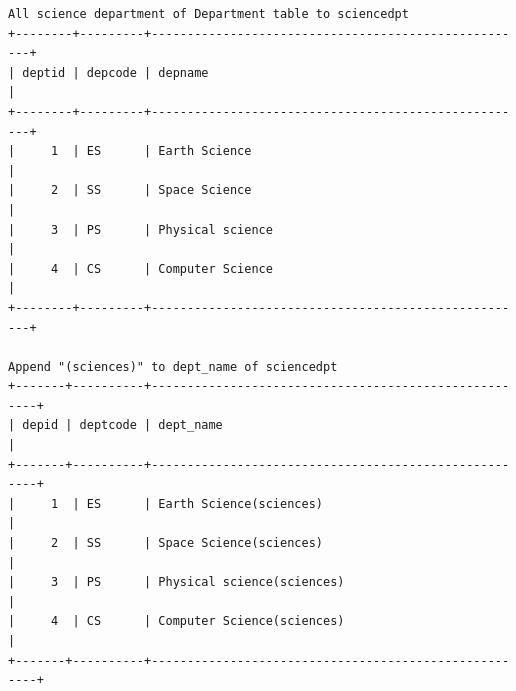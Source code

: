 \documentclass{article}
\begin{document}
\newpage
\fancyhead{} %
\newpage
{}
\begin{verbatim}
All science department of Department table to sciencedpt
+--------+---------+-----------------------------------------------------+
| deptid | depcode | depname                                             |
+--------+---------+-----------------------------------------------------+
|     1  | ES      | Earth Science                                       |
|     2  | SS      | Space Science                                       |
|     3  | PS      | Physical science                                    |
|     4  | CS      | Computer Science                                    |
+--------+---------+-----------------------------------------------------+

Append "(sciences)" to dept_name of sciencedpt
+-------+----------+------------------------------------------------------+
| depid | deptcode | dept_name                                            |
+-------+----------+------------------------------------------------------+
|     1  | ES      | Earth Science(sciences)                              |
|     2  | SS      | Space Science(sciences)                              |
|     3  | PS      | Physical science(sciences)                           |
|     4  | CS      | Computer Science(sciences)                           |
+-------+----------+------------------------------------------------------+
\end{verbatim}
\newpage
\end{document}
